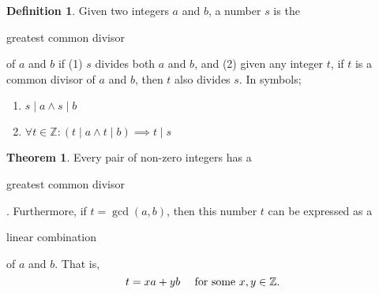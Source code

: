 \documentclass{article}
\theoremstyle{definition}
\newtheorem{theorem}{Theorem}
\theoremstyle{definition}
\newtheorem{definition}{Definition}
\begin{document}
\begin{definition}
Given two integers $a$ and $b$, a number $s$ is the \begin{em}greatest common divisor\end{em} of $a$ and $b$ if (1) $s$ divides both $a$ and $b$, and (2) given any integer $t$, if $t$ is a common divisor of $a$ and $b$, then $t$ also divides $s$. In symbols;
\begin{enumerate}
  \item $s \mid a \wedge s \mid b$
  \item $\forall t \in \mathbb{Z} : (t \mid a \wedge t \mid b) \implies t \mid s$
\end{enumerate}
\end{definition}

\begin{theorem}
Every pair of non-zero integers has a \begin{em}greatest common divisor\end{em}. Furthermore, if $t = \gcd (a, b)$, then this number $t$ can be expressed as a \begin{em}linear combination\end{em} of $a$ and $b$. That is,
$$t = xa + yb \text{ \quad for some $x, y \in \mathbb{Z}$. }$$
\end{theorem}
\end{document}

